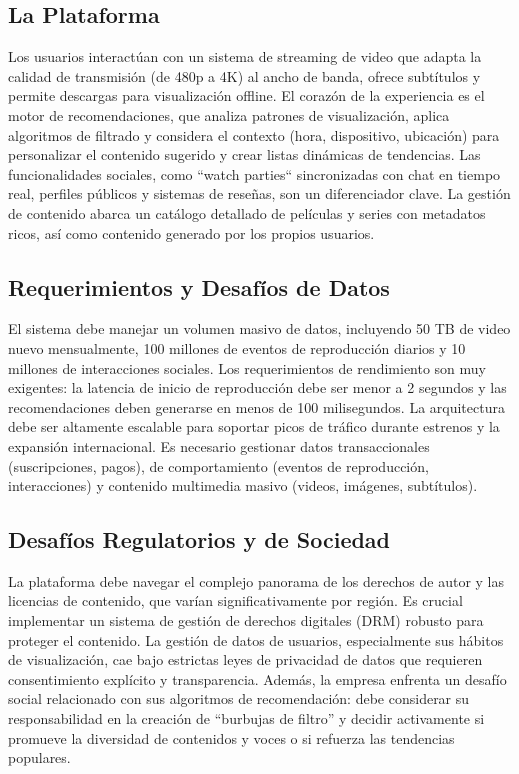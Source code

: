 \documentclass[12pt]{article}
\begin{document}
\subsection{La Plataforma}
Los usuarios interactúan con un sistema de streaming de video que adapta la calidad de transmisión (de 480p a 4K) al ancho de banda, ofrece subtítulos y permite descargas para visualización offline. El corazón de la experiencia es el motor de recomendaciones, que analiza patrones de visualización, aplica algoritmos de filtrado y considera el contexto (hora, dispositivo, ubicación) para personalizar el contenido sugerido y crear listas dinámicas de tendencias. Las funcionalidades sociales, como ``watch parties`` sincronizadas con chat en tiempo real, perfiles públicos y sistemas de reseñas, son un diferenciador clave. La gestión de contenido abarca un catálogo detallado de películas y series con metadatos ricos, así como contenido generado por los propios usuarios.

\subsection{Requerimientos y Desafíos de Datos}
El sistema debe manejar un volumen masivo de datos, incluyendo 50 TB de video nuevo mensualmente, 100 millones de eventos de reproducción diarios y 10 millones de interacciones sociales. Los requerimientos de rendimiento son muy exigentes: la latencia de inicio de reproducción debe ser menor a 2 segundos y las recomendaciones deben generarse en menos de 100 milisegundos. La arquitectura debe ser altamente escalable para soportar picos de tráfico durante estrenos y la expansión internacional. Es necesario gestionar datos transaccionales (suscripciones, pagos), de comportamiento (eventos de reproducción, interacciones) y contenido multimedia masivo (videos, imágenes, subtítulos).

\subsection{Desafíos Regulatorios y de Sociedad}
La plataforma debe navegar el complejo panorama de los derechos de autor y las licencias de contenido, que varían significativamente por región. Es crucial implementar un sistema de gestión de derechos digitales (DRM) robusto para proteger el contenido. La gestión de datos de usuarios, especialmente sus hábitos de visualización, cae bajo estrictas leyes de privacidad de datos que requieren consentimiento explícito y transparencia. Además, la empresa enfrenta un desafío social relacionado con sus algoritmos de recomendación: debe considerar su responsabilidad en la creación de ``burbujas de filtro'' y decidir activamente si promueve la diversidad de contenidos y voces o si refuerza las tendencias populares.
\end{document}
